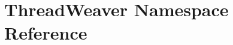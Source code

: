 \hypertarget{namespaceThreadWeaver}{\section{Thread\+Weaver Namespace Reference}
\label{namespaceThreadWeaver}
}
